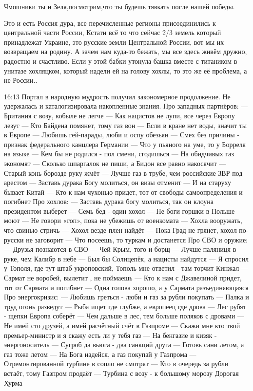 Чмошники ты и Зеля,посмотрим,что ты будешь тявкать после нашей победы.


Это и есть Россия дура, все перечисленные регионы присоединились к центральной
части России, Кстати всё то что сейчас 2/3 земель который принадлежат Украине,
это русские земли Центральной России, вот мы их возвращаем на родину. А зачем
нам куда-то бежать, мы все здесь живём дружно, радостно и счастливо. Если у
этой бабки утонула башка вместе с титаником в унитазе хохляцком, который надели
ей на голову хохлы, то это же её проблема, а не России..

16:13
Портал в народную мудрость получил закономерное продолжение.
Не удержалась и каталогизировала накопленные знания.
Про западных партнёров:
— Британия с возу, кобыле не легче
— Как нацистов не лупи, все через Европу лезут
— Кто Байдена помянет, тому газ вон
— Если в кране нет воды, значит ты в Европе
— Любишь гей-парады, люби и оспу обезьян
— Смех без причины - признак федерального канцлера Германии
— Что у пьяного на уме, то у Борреля на языке
— Кем бы не родился - пол смени, сгодишься
— На обидчивых газ экономят
— Сколько шпаргалок не пиши, а Бидон все равно накосячит
— Старый конь борозде руку жмёт
— Лучше газ в трубе, чем российские ЗВР под арестом
— Заставь дурака Богу молиться, он визы отменит
— И на старуху бывает Китай
— Кто к нам чухонью придет, тот от свободы самоопределения и погибнет
Про хохлов:
— Заставь дурака богу молиться, так он клоуна президентом выберет
— Семь бед - один хохол
— Не боги горшки в Польше моют
— Не говори «гоп», пока не убежишь от военкомата
— Хохла вооружать, что свинью стричь
— Хохол везде плен найдёт
— Пока Град не грянет, хохол по-русски не заговорит
— Что посеешь, то туркам и достанется
Про СВО и оружие:
— Друзья познаются в СВО
— Чей Крым, того и борщ
— Лучше паляниця в руке, чем Калибр в небе
— Был бы Солнцепёк, а нацисты найдутся
— Я спросил у Тополя, где тут штаб укроповский, Тополь мне ответил - там торчит Кинжал
— Сармат не воробей, вылетит , не поймаешь
— Кто к нам с Джавелиной придет, тот от Сармата и погибнет
— Одна голова хорошо, а у Сармата разъединяющаяся
Про энергокризис:
— Любишь греться - люби и газ за рубли покупать
— Палка и труд огонь разведут
— Рыба ищет где глубже, а европеец где дрова
— Лес рубят - щепки Европа соберёт
— Чем дальше в лес, тем больше поляков с дровами
— Не имей сто друзей, а имей расчётный счёт в Газпроме
— Скажи мне кто твой премьер-министр и я скажу есть ли у тебя газ
— На бенгазие и кизяк - энергоноситель
— Сугроб да вьюга - два санкций друга
— Готовь сани летом, а газ тоже летом
— На Бога надейся, а газ покупай у Газпрома
— Отремонтированной турбине в сопло не смотрят
— Кто в очередь за рубли встаёт, тому Газпром продаёт
— Турбина с возу - к большому морозу
Дорогая Хурма

